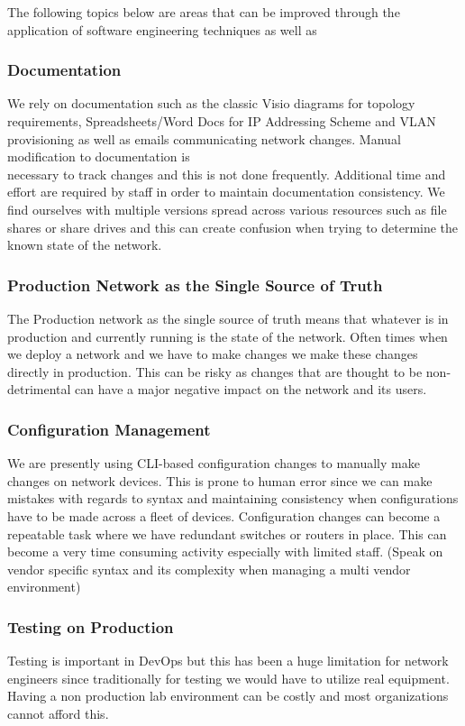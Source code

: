 \documentclass[12pt, letterpaper]{article}
\begin{document}
\medskip

The following topics below are areas that can be improved through the application of software engineering techniques as well as 

	\subsubsection{Documentation}
We rely on documentation such as the classic Visio diagrams for topology requirements, Spreadsheets/Word Docs for IP Addressing Scheme and VLAN provisioning as well as emails communicating network changes. Manual modification to documentation is \\
necessary to track changes and this is not done frequently. Additional time and effort are required by staff in order to maintain documentation consistency. We find ourselves with multiple versions spread across various resources such as file shares or share drives and this can create confusion when trying to determine the known state of the network.

	\subsubsection{Production Network as the Single Source of Truth}
The Production network as the single source of truth means that whatever is in production and currently running is the state of the network. Often times when we deploy a network and we have to make changes we make these changes directly in production. This can be risky as changes that are thought to be non-detrimental can have a major negative impact on the network and its users. 
	
	\subsubsection{Configuration Management}
We are presently using CLI-based configuration changes to manually make changes on network devices. This is prone to human error since we can make mistakes with regards to syntax and maintaining consistency when configurations have to be made across a fleet of devices. Configuration changes can become a repeatable task where we have redundant switches or routers in place. This can become a very time consuming activity especially with limited staff. (Speak on vendor specific syntax and its complexity when managing a multi vendor environment)
	
	\subsubsection{Testing on Production}
Testing is important in DevOps but this has been a huge limitation for network engineers since traditionally for testing we would have to utilize real equipment. Having a non production lab environment can be costly and most organizations cannot afford this. 
	
\end{document}
